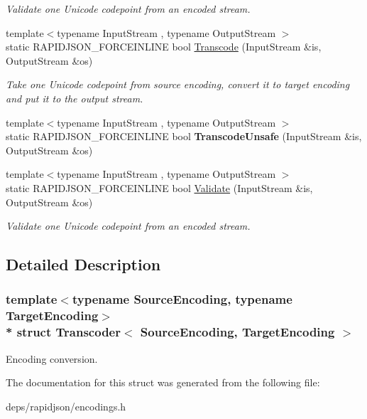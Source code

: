 \begin{DoxyCompactItemize}
\begin{DoxyCompactList}\small\item\em Validate one Unicode codepoint from an encoded stream. \end{DoxyCompactList}\item 
{\footnotesize template$<$typename Input\+Stream , typename Output\+Stream $>$ }\\static R\+A\+P\+I\+D\+J\+S\+O\+N\+\_\+\+F\+O\+R\+C\+E\+I\+N\+L\+I\+NE bool \hyperlink{struct_transcoder_a0ea2edfe35784ebf1063921d2bd5fb66}{Transcode} (Input\+Stream \&is, Output\+Stream \&os)\hypertarget{struct_transcoder_a0ea2edfe35784ebf1063921d2bd5fb66}{}\label{struct_transcoder_a0ea2edfe35784ebf1063921d2bd5fb66}

\begin{DoxyCompactList}\small\item\em Take one Unicode codepoint from source encoding, convert it to target encoding and put it to the output stream. \end{DoxyCompactList}\item 
{\footnotesize template$<$typename Input\+Stream , typename Output\+Stream $>$ }\\static R\+A\+P\+I\+D\+J\+S\+O\+N\+\_\+\+F\+O\+R\+C\+E\+I\+N\+L\+I\+NE bool {\bfseries Transcode\+Unsafe} (Input\+Stream \&is, Output\+Stream \&os)\hypertarget{struct_transcoder_a16345a912c679b2ea197328eb1444f82}{}\label{struct_transcoder_a16345a912c679b2ea197328eb1444f82}

\item 
{\footnotesize template$<$typename Input\+Stream , typename Output\+Stream $>$ }\\static R\+A\+P\+I\+D\+J\+S\+O\+N\+\_\+\+F\+O\+R\+C\+E\+I\+N\+L\+I\+NE bool \hyperlink{struct_transcoder_a8a64aa837f7962894a99f63232472543}{Validate} (Input\+Stream \&is, Output\+Stream \&os)\hypertarget{struct_transcoder_a8a64aa837f7962894a99f63232472543}{}\label{struct_transcoder_a8a64aa837f7962894a99f63232472543}

\begin{DoxyCompactList}\small\item\em Validate one Unicode codepoint from an encoded stream. \end{DoxyCompactList}\end{DoxyCompactItemize}


\subsection{Detailed Description}
\subsubsection*{template$<$typename Source\+Encoding, typename Target\+Encoding$>$\\*
struct Transcoder$<$ Source\+Encoding, Target\+Encoding $>$}

Encoding conversion. 

The documentation for this struct was generated from the following file\+:\begin{DoxyCompactItemize}
\item 
deps/rapidjson/encodings.\+h\end{DoxyCompactItemize}
